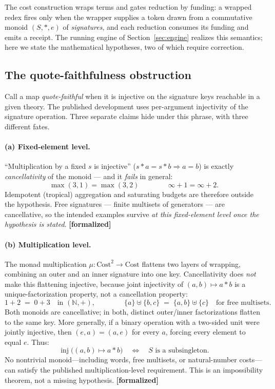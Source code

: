 \documentclass[11pt]{article}
\newcommand{\formalized}{\textbf{[formalized]}}
\begin{document}
The cost construction wraps terms and gates reduction by funding: a
wrapped redex fires only when the wrapper supplies a token drawn from a
commutative monoid $(S, *, e)$ of \emph{signatures}, and each reduction
consumes its funding and emits a receipt. The running engine of
Section~\ref{sec:engine} realizes this semantics; here we state the
mathematical hypotheses, two of which require correction.

\subsection{The quote-faithfulness obstruction}

Call a map \emph{quote-faithful} when it is injective on the signature
keys reachable in a given theory. The published development uses
per-argument injectivity of the signature operation. Three separate
claims hide under this phrase, with three different fates.

\paragraph{(a) Fixed-element level.} ``Multiplication by a fixed $s$ is
injective'' ($s * a = s * b \Rightarrow a = b$) is exactly
\emph{cancellativity} of the monoid --- and it \emph{fails} in general:
\[
\max(3, 1) = \max(3, 2)
\qquad\qquad
\infty + 1 = \infty + 2 .
\]
Idempotent (tropical) aggregation and saturating budgets are therefore
outside the hypothesis. Free signatures --- finite multisets of
generators --- are cancellative, so the intended examples survive
\emph{at this fixed-element level once the hypothesis is stated}.
\formalized{}

\paragraph{(b) Multiplication level.} The monad multiplication
$\mu : \mathrm{Cost}^2 \to \mathrm{Cost}$ flattens two layers of
wrapping, combining an outer and an inner signature into one key.
Cancellativity does \emph{not} make this flattening injective, because
joint injectivity of $(a,b) \mapsto a * b$ is a unique-factorization
property, not a cancellation property:
\[
1 + 2 \;=\; 0 + 3 \quad\text{in } (\mathbb{N}, +),
\qquad\qquad
\{a\} \uplus \{b, c\} \;=\; \{a, b\} \uplus \{c\}
\quad\text{for free multisets.}
\]
Both monoids are cancellative; in both, distinct outer/inner
factorizations flatten to the same key.  More generally, if a binary
operation with a two-sided unit were jointly injective, then
$(e,a)=(a,e)$ for every $a$, forcing every element to equal $e$.  Thus:
\[
  \operatorname{inj}\bigl((a,b)\mapsto a*b\bigr)
  \quad\Longleftrightarrow\quad
  S\text{ is a subsingleton}.
\]
No nontrivial monoid---including words, free multisets, or natural-number
costs---can satisfy the published multiplication-level requirement.  This is
an impossibility theorem, not a missing hypothesis. \formalized{}
\end{document}
